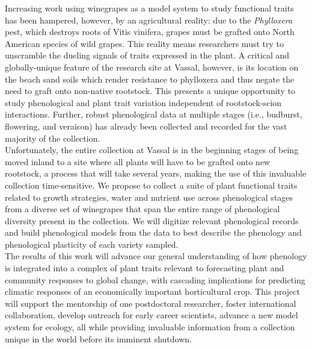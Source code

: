 \documentclass[10pt,letter,oneside]{article}
\begin{document}
Increasing work using winegrapes as a model system to study functional traits has been hampered, however, by an agricultural reality: due to the \emph{Phylloxera} pest, which destroys roots of Vitis vinifera, grapes must be grafted onto North American species of wild grapes. This reality means researchers must try to unscramble the dueling signals of traits expressed in the plant. A critical and globally-unique feature of the research site at Vassal, however, is its location on the beach sand soils which render resistance to phylloxera and thus negate the need to graft onto non-native rootstock. This presents a unique opportunity to study phenological and plant trait variation independent of rootstock-scion interactions. Further, robust phenological data at multiple stages (i.e., budburst, flowering, and veraison) has already been collected and recorded for the vast majority of the collection. \\

Unfortunately, the entire collection at Vassal is in the beginning stages of being moved inland to a site where all plants will have to be grafted onto new rootstock, a process that will take several years, making the use of this invaluable collection time-sensitive. We propose to collect a suite of plant functional traits related to growth strategies, water and nutrient use across phenological stages from a diverse set of winegrapes that span the entire range of phenological diversity present in the collection. We will digitize relevant phenological records and build phenological models from the data to best describe the phenology and phenological plasticity of each variety sampled. \\ %

The results of this work will advance our general understanding of how phenology is integrated into a complex of plant traits relevant to forecasting  plant and community responses to global change, with cascading implications for predicting climatic responses of an economically important horticultural crop. This project will support the mentorship of one postdoctoral researcher, foster international collaboration, develop outreach for early career scientists, advance a new model system for ecology, all while providing invaluable information from a collection unique in the world before its imminent shutdown.\\ 
\end{document}
